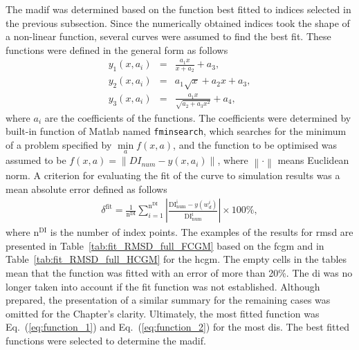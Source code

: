 \documentclass[11pt,a4paper,final]{report}
\theoremstyle{plain}
\begin{document}
The \ac{madif} was determined based on the function best fitted to indices selected in the previous subsection.
Since the numerically obtained indices took the shape of a non-linear function, several curves were assumed to find the best fit.
These functions were defined in the general form as follows
\begin{eqnarray}
	y_1(x,a_i) & = & \frac{a_1x}{x+a_2}+a_3,
	\label{eq:function_1}\\
	y_2(x,a_i) & = & a_1\sqrt{x} + a_2x+a_3,
	\label{eq:function_2}\\
	y_3(x,a_i) & = & \frac{a_1x}{\sqrt{a_2 + a_3x^2}}+a_4,\label{eq:function_3} 
\end{eqnarray}
where \(a_i\) are the coefficients of the functions.
The coefficients were determined by built-in function of Matlab named \verb+fminsearch+, which searches for the minimum of a problem specified by \(\min\limits_a f(x,a)\), and the function to be optimised was assumed to be \(f(x,a)=\left\|DI_{num} - y(x,a_i)\right\|\), where \(\left\|\cdot\right\|\) means Euclidean norm.
A criterion for evaluating the fit of the curve to simulation results was a mean absolute error defined as follows
\begin{eqnarray}
	\delta^{\mathrm{fit}} = \frac{1}{\mathrm{n^{DI}}}\sum_{i=1}^{\mathrm{n^{DI}}} \left|\frac{\mathrm{DI^i_{num}}-y(w_d^i)}{\mathrm{DI^i_{num}}}\right|\times100\%,
\end{eqnarray}
where \(\mathrm{n^{DI}}\) is the number of index points.
The examples of the results for \ac{rmsd} are presented in Table~\ref{tab:fit_RMSD_full_FCGM} based on the \ac{fcgm} and in Table~\ref{tab:fit_RMSD_full_HCGM} for the \ac{hcgm}.
The empty cells in the tables mean that the function was fitted with an error of more than 20\%.
The \ac{di} was no longer taken into account if the fit function was not established.
Although prepared, the presentation of a similar summary for the remaining cases was omitted for the Chapter's clarity.
Ultimately, the most fitted function was Eq.~(\ref{eq:function_1}) and Eq.~(\ref{eq:function_2}) for the most \acp{di}.
The best fitted functions were selected to determine the \ac{madif}.
\end{document}
